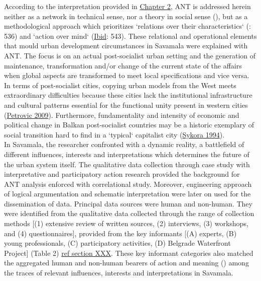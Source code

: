 \documentclass[11pt]{report}
\begin{document}
According to the interpretation provided in \href{ref}{Chapter 2}, ANT is addressed herein neither as a network in technical sense, nor a theory in social sense (\cite{Latour 1996}), but as a methodological approach which prioritizes  `relations over their characteristics` (\cite{Cerulo 2009}: 536) and `action over mind` (\href{ref}{Ibid}: 543). These relational and operational elements that mould urban development circumstances in Savamala were explained with ANT. The focus is on an actual post-socialist urban setting and the generation of maintenance, transformation and/or change of the current state of the affairs when global aspects are transformed to meet local specifications and vice versa. In terms of post-socialist cities, copying urban models from the West meets extraordinary difficulties because these cities lack the institutional infrastructure and cultural patterns essential for the functional unity present in western cities (\href{ref}{Petrovic 2009}). Furthermore, fundamentality and intensity of economic and political change in Balkan post-socialist countries may be a historic exemplary of social transition hard to find in a `typical` capitalist city (\href{ref}{Sykora 1994}).
\\
In Savamala, the researcher confronted with a dynamic reality, a battlefield of different influences, interests and interpretations which determines the future of the urban system itself. The qualitative data collection through case study with interpretative and participatory action research provided the background for ANT analysis enforced with correlational study. Moreover, engineering approach of logical argumentation and schematic interpretation were later on used for the dissemination of data. Principal data sources were human and non-human. They were identified from the qualitative data collected through the range of collection methods [(1) extensive review of written sources, (2) interviews, (3) workshops, and (4) questionnaires], provided from the key informants [(A) experts, (B) young professionals, (C) participatory activities, (D) Belgrade Waterfront Project] (Table 2) \href{ref}{ref section XXX}. These key informant categories also matched the aggregated human and non-human bearers of action and meaning (\cite{Latour 2005}) among the traces of relevant influences, interests and interpretations in Savamala.
\\
\end{document}
